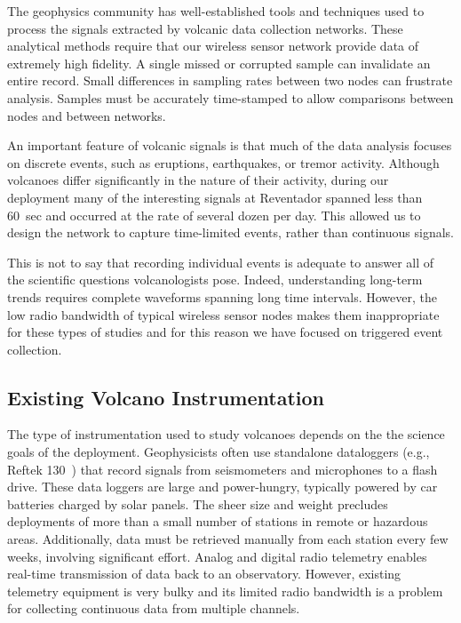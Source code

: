 The geophysics community has well-established tools and techniques used to
process the signals extracted by volcanic data collection networks. These
analytical methods require that our wireless sensor network provide data of
extremely high fidelity. A single missed or corrupted sample can invalidate
an entire record. Small differences in sampling rates between two nodes can
frustrate analysis. Samples must be accurately time-stamped to allow
comparisons between nodes and between networks.

An important feature of volcanic signals is that much of the data analysis
focuses on discrete events, such as eruptions, earthquakes, or tremor
activity. Although volcanoes differ significantly in the nature of their
activity, during our deployment many of the interesting signals at Reventador
spanned less than 60~sec and occurred at the rate of several dozen per day.
This allowed us to design the network to capture time-limited events, rather
than continuous signals. 

This is not to say that recording individual events is adequate to answer all
of the scientific questions volcanologists pose. Indeed, understanding
long-term trends requires complete waveforms spanning long time intervals.
However, the low radio bandwidth of typical wireless sensor nodes makes them
inappropriate for these types of studies and for this reason we have focused
on triggered event collection.

\subsection{Existing Volcano Instrumentation}

The type of instrumentation used to study volcanoes depends on the the
science goals of the deployment.  Geophysicists often use standalone
dataloggers (e.g., Reftek 130~\cite{reftek}) that record signals from
seismometers and microphones to a flash drive. These data loggers are large
and power-hungry, typically powered by car batteries charged by solar panels.
The sheer size and weight precludes deployments of more than a small number
of stations in remote or hazardous areas. Additionally, data must be
retrieved manually from each station every few weeks, involving significant
effort. Analog and digital radio telemetry enables real-time transmission of
data back to an observatory. However, existing telemetry equipment is very
bulky and its limited radio bandwidth is a problem for collecting continuous
data from multiple channels.

